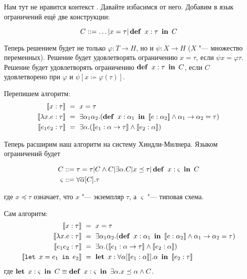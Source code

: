 Нам тут не нравится контекст \todo. Давайте избасимся от него.
Добавим в язык ограничений ещё две конструкции:
\begin{bnf}
\[
    C ::= \ldots | x = \tau | \mathinner\mathbf{def}~x : \tau~\mathinner\mathbf{in}~C
\]
\end{bnf}%
Теперь решением будет не только $\varphi : T \rightarrow H$, но и $\psi : X \rightarrow H$ ($X$ "--- множество переменных).
Решение будет удовлетворять ограничению $x = \tau$, если $\psi x = \varphi \tau$.
Решение будет удовлетворять ограничению $\mathinner\mathbf{def}~x:\tau~\mathinner\mathbf{in}~C$, если $C$ удовлетворено при $\varphi$ и $\psi[x \coloneqq \varphi(\tau)]$.

Перепишем алгоритм:
\begin{align*}
    \restr{x : \tau} \ &=\  x = \tau \\
    \restr{\lambda x . e : \tau} \ &=\ 
        \exists \alpha_1 \alpha_2 . (\deff{x : \alpha_1}{\restr{e:\alpha_2}} \land \alpha_1\rightarrow\alpha_2=\tau) \\
    \restr{e_1 e_2 : \tau} \ &=\ 
        \exists\alpha.(\restr{e_1 :\alpha\rightarrow\tau} \land \restr{e_2 : \alpha})
\end{align*}

Теперь расширим наш алгоритм на систему Хиндли-Милнера. Языком ограничений будет
\begin{bnf}
\begin{align*}
    C &::= \tau = \tau | C \land C | \exists \alpha . C | x \preceq \tau | \mathinner\mathbf{def}~x : \varsigma~\mathinner\mathbf{in}~C \\
    \varsigma &::= \forall \overline\alpha[C] . \tau
\end{align*}
\end{bnf}%
где $x \preceq \tau$ означает, что $x$ "--- экземпляр $\tau$, а $\varsigma$ "--- типовая схема.

Сам алгоритм:
\begin{align*}
    \restr{x : \tau} \ &=\  x = \tau \\
    \restr{\lambda x . e : \tau} \ &=\ 
        \exists \alpha_1 \alpha_2 . (\deff{x : \alpha_1}{\restr{e:\alpha_2}} \land \alpha_1\rightarrow\alpha_2=\tau) \\
    \restr{e_1 e_2 : \tau} \ &=\ 
        \exists\alpha.(\restr{e_1 :\alpha\rightarrow\tau} \land \restr{e_2 : \alpha}) \\
    \restr{\lett{x = e_1}{e_2}} \ &=\ \deflet{x : \forall \alpha[\restr{e_1 : \alpha}].\alpha}
        {\restr{e_2:\tau}}
\end{align*}
где $\mathinner{\mathbf{let}}~x : \varsigma~\mathinner{\mathbf{in}}~C \equiv \mathinner\mathbf{def}~x : \varsigma~\mathinner\mathbf{in}~\exists \alpha . x \preceq \alpha \land C$.
\\ \todo

